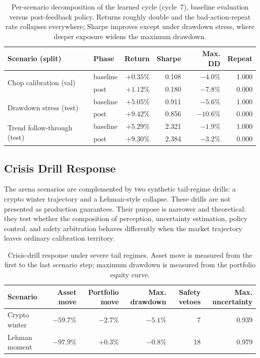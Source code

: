 \documentclass[10pt]{article}
\begin{document}
\begin{table}[htbp]
	\centering
	\small
	\caption{Per-scenario decomposition of the learned cycle (cycle~7), baseline evaluation
		versus post-feedback policy. Returns roughly double and the bad-action-repeat rate
		collapses everywhere; Sharpe improves except under drawdown stress, where deeper exposure
		widens the maximum drawdown.}
	\label{tab:learned-scenario}
	\begin{tabular}{llrrrr}
		\toprule
		Scenario (split) & Phase & Return & Sharpe & Max. DD & Repeat \\
		\midrule
		\multirow{2}{*}{Chop calibration (val)}    & baseline & \(+0.35\%\) & 0.108 & \(-4.0\%\)  & 1.000 \\
		                                           & post     & \(+1.12\%\) & 0.180 & \(-7.8\%\)  & 0.000 \\
		\midrule
		\multirow{2}{*}{Drawdown stress (test)}    & baseline & \(+5.05\%\) & 0.911 & \(-5.6\%\)  & 1.000 \\
		                                           & post     & \(+9.42\%\) & 0.856 & \(-10.6\%\) & 0.000 \\
		\midrule
		\multirow{2}{*}{Trend follow-through (test)} & baseline & \(+5.29\%\) & 2.321 & \(-1.9\%\)  & 1.000 \\
		                                           & post     & \(+9.30\%\) & 2.384 & \(-3.2\%\)  & 0.000 \\
		\bottomrule
	\end{tabular}
\end{table}

\subsection{Crisis Drill Response}

The arena scenarios are complemented by two synthetic tail-regime drills: a crypto winter
trajectory and a Lehman-style collapse. These drills are not presented as production guarantees.
Their purpose is narrower and theoretical: they test whether the composition of perception,
uncertainty estimation, policy control, and safety arbitration behaves differently when the
market trajectory leaves ordinary calibration territory.

\begin{table}[htbp]
	\centering
	\small
	\caption{Crisis-drill response under severe tail regimes. Asset move is measured from
		the first to the last scenario step; maximum drawdown is measured from the portfolio
		equity curve.}
	\label{tab:crisis-drills}
	\begin{tabular}{lrrrrr}
		\toprule
		Scenario & Asset move & Portfolio move & Max. drawdown & Safety vetoes & Max. uncertainty \\
		\midrule
		Crypto winter  & \(-59.7\%\) & \(-2.7\%\) & \(-5.1\%\) &  7 & 0.939 \\
		Lehman moment  & \(-97.9\%\) & \(+0.3\%\) & \(-0.8\%\) & 18 & 0.979 \\
		\bottomrule
	\end{tabular}
\end{table}
\end{document}

